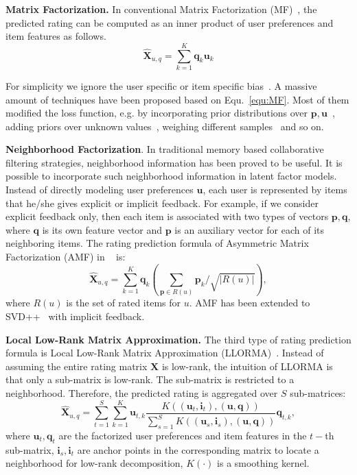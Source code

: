 \documentclass[letterpaper]{article} %
\newcommand{\Rating}{\mathbf{X}}
\begin{document}
\textbf{Matrix Factorization.} In conventional Matrix Factorization (MF)~\cite{Koren2009Matrix}, the predicted rating can be computed as an inner product of user preferences and item features as follows.
\begin{equation}\label{equ:MF}
 \hat{\mathbf{X}}_{u,q}=\sum_{k=1}^{K} \mathbf{q}_k \mathbf{u}_k
\end{equation}

For simplicity we ignore the user specific or item specific bias~\cite{Koren2009Matrix}. A massive amount of techniques have been proposed based on Equ.~\ref{equ:MF}. Most of them modified the loss function, e.g. by incorporating prior distributions over $\mathbf{p},\mathbf{u}$~\cite{salakhutdinov2008probabilistic}, adding priors over unknown values~\cite{Devooght2015Dynamic}, weighing different samples~\cite{Pil'aszy2010Fast} and so on.  

\textbf{Neighborhood Factorization}. In traditional memory based collaborative filtering strategies, neighborhood information has been proved to be useful. It is possible  to incorporate such neighborhood information in latent factor models. Instead of directly modeling user preferences $\mathbf{u}$, each user is represented by items that he/she gives explicit or implicit feedback. For example, if we consider explicit feedback only, then each item is associated with two types of vectors $\mathbf{p},\mathbf{q}$, where $\mathbf{q}$ is its own feature vector and $\mathbf{p}$ is an auxiliary vector for each of its neighboring items. The rating prediction formula of Asymmetric Matrix Factorization (AMF) in ~\cite{Koren2008Factorization} is:  
 \begin{equation}\label{equ:AMF}
\hat{\Rating}_{u,q}=\sum_{k=1}^{K} \mathbf{q}_{k} (\sum_{\mathbf{p} \in R(u)} \mathbf{p}_k/\sqrt{|R(u)|} ),
\end{equation}
where  $R(u)$ is the set of rated items for $u$. AMF has been extended to SVD++~\cite{Koren2008Factorization} with implicit feedback. 

\textbf{Local Low-Rank Matrix Approximation.} The third type of rating prediction formula is  Local Low-Rank Matrix Approximation (LLORMA)~\cite{Lee2016LLORMA}. Instead of assuming the entire rating matrix $\Rating$ is low-rank, the intuition of LLORMA is that only a sub-matrix is low-rank. The sub-matrix is restricted to a neighborhood. Therefore, the predicted rating is aggregated over $S$ sub-matrices:
\begin{equation}\label{equ:LLORMA}
\hat{\Rating}_{u,q} = \sum_{t=1}^{S} \sum_{k=1}^K \mathbf{u}_{t, k} \frac{K((\mathbf{u}_t,\mathbf{i}_t),(\mathbf{u},\mathbf{q}))}{\sum_{s=1}^{S} K((\mathbf{u}_s,\mathbf{i}_s),(\mathbf{u},\mathbf{q}))} \mathbf{q}_{t,k},
\end{equation}
where $\mathbf{u}_t, \mathbf{q}_t$ are the factorized user preferences and item features in the $t-$th sub-matrix,  $\mathbf{i}_s,\mathbf{i}_t$ are anchor points in the corresponding matrix to locate a neighborhood for low-rank decomposition, $K(\cdot)$ is a smoothing kernel. 
\end{document}
